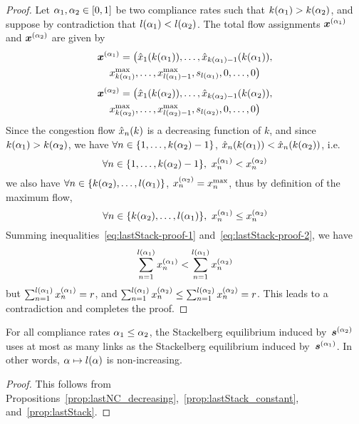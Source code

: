 \begin{proof}
Let $\alpha_1, \alpha_2 \in [0,1]$ be two compliance rates such that $k(\alpha_1) > k(\alpha_2)$, and suppose by contradiction that $l(\alpha_1) < l(\alpha_2)$. The total flow assignments $\boldsymbol {x}^{(\alpha_1)}$ and $\boldsymbol {x}^{(\alpha_2)}$ are given by
\begin{multline*}
\boldsymbol {x}^{(\alpha_1)} = \big( \hat{x}_{1} ( k(\alpha_1) ), \dots, \hat{x}_{k(\alpha_1) - 1} ( k(\alpha_1) ), \\
x^{\max}_{k(\alpha_1)}, \dots, x^{\max}_{l(\alpha_1) - 1}, 
s_{l(\alpha_1)}, 0, \dots, 0 \big)
\end{multline*}
\begin{multline*}
\boldsymbol {x}^{(\alpha_2)} = \big( \hat{x}_{1} ( k(\alpha_2) ), \dots, \hat{x}_{k(\alpha_2) - 1} ( k(\alpha_2) ), \\
x^{\max}_{k(\alpha_2)}, \dots, x^{\max}_{l(\alpha_2) - 1}, 
s_{l(\alpha_2)}, 0, \dots, 0 \big)
\end{multline*}
Since the congestion flow $\hat{x}_{n} ( k )$ is a decreasing function of $k$, and since $k(\alpha_1) > k(\alpha_2)$, we have ${ \forall n \in \{ 1, \dots, k(\alpha_2) - 1\} }$, ${ \hat{x}_{n} ( k(\alpha_1) ) < \hat{x}_{n} ( k(\alpha_2) ) }$, i.e.
\begin{equation}
\forall n \in \{ 1, \dots, k(\alpha_2) - 1\}, \ x_n^{(\alpha_1)} <  x_n^{(\alpha_2)} 
\label{eq:lastStack-proof-1}
\end{equation}
we also have $\forall n \in \{ k(\alpha_2), \dots, l(\alpha_1) \}$, $x_n^{(\alpha_2)} = x^{\max}_n$, thus by definition of the maximum flow, 
\begin{equation}
\forall n \in \{ k(\alpha_2), \dots, l(\alpha_1) \}, \ x_n^{(\alpha_1)} \leq x_n^{(\alpha_2)}
\label{eq:lastStack-proof-2}
\end{equation}
Summing inequalities~\eqref{eq:lastStack-proof-1} and~\eqref{eq:lastStack-proof-2}, we have
\[
\sum_{n = 1}^{l(\alpha_1)} x_n^{(\alpha_1)} < \sum_{n = 1}^{l(\alpha_1)} x_n^{(\alpha_2)}
\]
but $\sum_{n = 1}^{l(\alpha_1)} x_n^{(\alpha_1)} = r$, and $\sum_{n = 1}^{l(\alpha_1)} x_n^{(\alpha_2)} \leq \sum_{n = 1}^{l(\alpha_2)} x_n^{(\alpha_2)} = r$. This leads to a contradiction and completes the proof.
\end{proof}


\begin{lemma}
\label{lem:lastStack_decreasing}
For all compliance rates $\alpha_1 \leq \alpha_2$, the Stackelberg equilibrium induced by~$\boldsymbol {s}^{(\alpha_2)}$ uses at most as many links as the Stackelberg equilibrium induced by~$\boldsymbol {s}^{(\alpha_1)}$. In other words, $\alpha \mapsto l(\alpha)$ is non-increasing.
\end{lemma}
\begin{proof}
This follows from Propositions~\ref{prop:lastNC_decreasing},~\ref{prop:lastStack_constant}, and~\ref{prop:lastStack}.
\end{proof}

